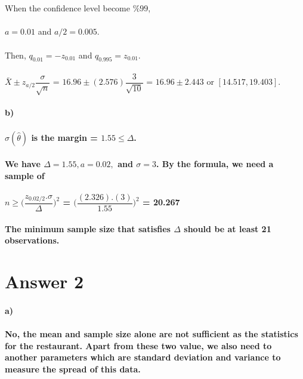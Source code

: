 \documentclass[12pt]{article}
\begin{document}
{\\\\ When the confidence level become $\%99$,
\\\\ {\hspace*{50}} $a = 0.01$ and $a/2 = 0.005$. 
\\\\ Then, $q_{0.01} = -z_{0.01}$ and $q_{0.995} = z_{0.01}$.
\\\\ {\hspace*{50}} $\bar{X} \pm z_{a/2} \dfrac{\sigma}{\sqrt{n}}$ = $16.96 \pm (2.576)\dfrac{3}{\sqrt{10}}$ = $16.96 \pm 2.443 $ or $ [14.517,19.403]$. 
}
\newpage
\paragraph{b)
\\\\ $\sigma(\hat{\theta})$ is the margin = $1.55 \leq \Delta$.
\\\\ We have $\Delta = 1.55, a = 0.02, $ and $ \sigma = 3$. By the formula, we need a sample of 
\\\\ {\hspace*{50}} $ n \geq \Big(\dfrac{z_{0.02/2} . \sigma}{\Delta}\Big)^2 $ = $\Big(\dfrac{(2.326).(3)}{1.55}\Big)^2$ = 20.267
\\\\ The minimum sample size that satisfies $\Delta$ should be at least 21 observations.
}

\section*{Answer 2}
\paragraph{a)
\\\\No, the mean and sample size alone are not sufficient as the statistics for the restaurant. Apart from these two value, we also need to  another parameters which are standard deviation and variance to measure the spread of this data.
}
\end{document}
